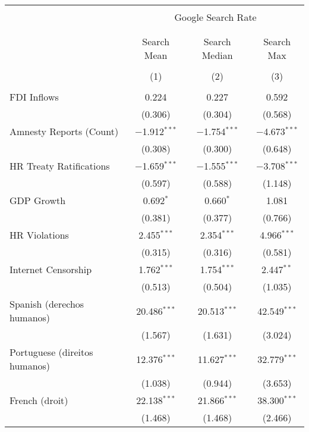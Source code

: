 
\begin{table}[!htbp] \centering 
  \caption{} 
  \label{} 
\begin{tabular}{@{\extracolsep{5pt}}lccc} 
\\[-1.8ex]\hline 
\hline \\[-1.8ex] 
 & \multicolumn{3}{c}{Google Search Rate} \\ 
\cline{2-4} 
\\[-1.8ex] & \multicolumn{3}{c}{ } \\ 
 & Search Mean & Search Median & Search Max \\ 
\\[-1.8ex] & (1) & (2) & (3)\\ 
\hline \\[-1.8ex] 
 FDI Inflows & 0.224 & 0.227 & 0.592 \\ 
  & (0.306) & (0.304) & (0.568) \\ 
  Amnesty Reports (Count) & $-$1.912$^{***}$ & $-$1.754$^{***}$ & $-$4.673$^{***}$ \\ 
  & (0.308) & (0.300) & (0.648) \\ 
  HR Treaty Ratifications & $-$1.659$^{***}$ & $-$1.555$^{***}$ & $-$3.708$^{***}$ \\ 
  & (0.597) & (0.588) & (1.148) \\ 
  GDP Growth & 0.692$^{*}$ & 0.660$^{*}$ & 1.081 \\ 
  & (0.381) & (0.377) & (0.766) \\ 
  HR Violations & 2.455$^{***}$ & 2.354$^{***}$ & 4.966$^{***}$ \\ 
  & (0.315) & (0.316) & (0.581) \\ 
  Internet Censorship & 1.762$^{***}$ & 1.754$^{***}$ & 2.447$^{**}$ \\ 
  & (0.513) & (0.504) & (1.035) \\ 
  Spanish (derechos humanos) & 20.486$^{***}$ & 20.513$^{***}$ & 42.549$^{***}$ \\ 
  & (1.567) & (1.631) & (3.024) \\ 
  Portuguese (direitos humanos) & 12.376$^{***}$ & 11.627$^{***}$ & 32.779$^{***}$ \\ 
  & (1.038) & (0.944) & (3.653) \\ 
  French (droit) & 22.138$^{***}$ & 21.866$^{***}$ & 38.300$^{***}$ \\ 
  & (1.468) & (1.468) & (2.466) \\ 

\end{tabular}
\end{table}
